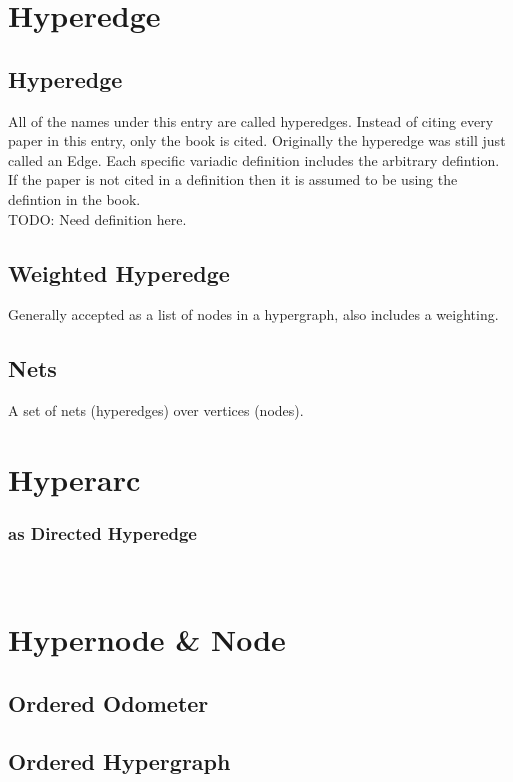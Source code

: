 \documentclass[10pt]{article}
\begin{document}
\section{Hyperedge}
\subsection{Hyperedge}
All of the names under this entry are called hyperedges. Instead of citing every paper in this entry, only the book is cited. Originally the hyperedge was still just called an Edge. Each specific variadic definition includes the arbitrary defintion. If the paper is not cited in a definition then it is assumed to be using the defintion in the book. ~\cite{Hypergraph:Book}\\

TODO: Need definition here.

\subsection{Weighted Hyperedge}
Generally accepted as a list of nodes in a hypergraph, also includes a weighting.

\subsection{Nets}
A set of nets (hyperedges) over vertices (nodes).
~\cite{catalyurek2007hypergraph}


\section{Hyperarc}
\subsubsection{as Directed Hyperedge}
~\cite{molnar2014applications}


\section{Hypernode \& Node}




\subsection{Ordered Odometer}
\subsection{Ordered Hypergraph}
\end{document}
